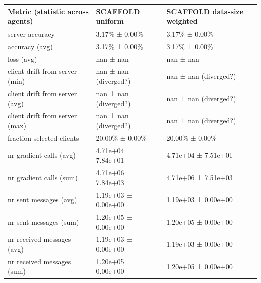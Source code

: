 \begin{tabular}{lll}
\hline
 Metric (statistic across agents)   & SCAFFOLD uniform      & SCAFFOLD data-size weighted   \\
\hline
 server accuracy                    & 3.17\% ± 0.00\%         & 3.17\% ± 0.00\%                 \\
 accuracy (avg)                     & 3.17\% ± 0.00\%         & 3.17\% ± 0.00\%                 \\
 loss (avg)                         & nan ± nan             & nan ± nan                     \\
 client drift from server (min)     & nan ± nan (diverged?) & nan ± nan (diverged?)         \\
 client drift from server (avg)     & nan ± nan (diverged?) & nan ± nan (diverged?)         \\
 client drift from server (max)     & nan ± nan (diverged?) & nan ± nan (diverged?)         \\
 fraction selected clients          & 20.00\% ± 0.00\%        & 20.00\% ± 0.00\%                \\
 nr gradient calls (avg)            & 4.71e+04 ± 7.84e+01   & 4.71e+04 ± 7.51e+01           \\
 nr gradient calls (sum)            & 4.71e+06 ± 7.84e+03   & 4.71e+06 ± 7.51e+03           \\
 nr sent messages (avg)             & 1.19e+03 ± 0.00e+00   & 1.19e+03 ± 0.00e+00           \\
 nr sent messages (sum)             & 1.20e+05 ± 0.00e+00   & 1.20e+05 ± 0.00e+00           \\
 nr received messages (avg)         & 1.19e+03 ± 0.00e+00   & 1.19e+03 ± 0.00e+00           \\
 nr received messages (sum)         & 1.20e+05 ± 0.00e+00   & 1.20e+05 ± 0.00e+00           \\
\hline
\end{tabular}